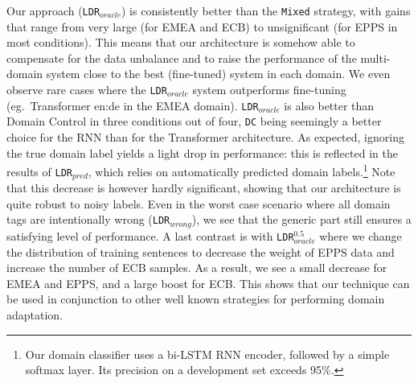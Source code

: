 Our approach (\texttt{LDR}$_{oracle}$) is consistently better than the \texttt{Mixed} strategy, with gains that range from very large (for EMEA and ECB) to unsignificant (for EPPS in most conditions). 
This means that our architecture is somehow able to compensate for the data unbalance and to raise the performance of the multi-domain system close to the best (fine-tuned) system in each domain. 
We even observe rare cases where the \texttt{LDR}$_{oracle}$ system outperforms fine-tuning (eg.\ Transformer en:de in the EMEA domain). 
\texttt{LDR}$_{oracle}$ is also better than Domain Control in three conditions out of four, \texttt{DC} being seemingly a better choice for the RNN than for the Transformer architecture. 
As expected, ignoring the true domain label yields a light drop in performance: this is reflected in the results of %
\texttt{LDR}$_{pred}$, which relies on automatically predicted domain labels.\footnote{Our domain classifier uses a bi-LSTM RNN encoder, followed by a simple softmax layer. 
Its precision on a development set exceeds 95\%.}
Note that this decrease is however hardly significant, showing that our architecture is quite robust to noisy labels. 
Even in the worst case scenario where all domain tags are intentionally wrong (\texttt{LDR}$_{wrong}$), we see that the generic part still ensures a satisfying level of performance. 
A last contrast is with \texttt{LDR}$_{oracle}^{0.5}$ where we change the distribution of training sentences to decrease the weight of EPPS data and increase the number of ECB samples. 
As a result, we see a small decrease for EMEA and EPPS, and a large boost for ECB. 
This shows that our technique can be used in conjunction to other well known strategies for performing domain adaptation. 

